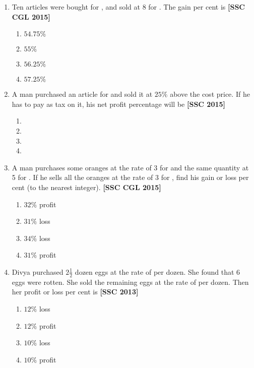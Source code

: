 \documentclass[twocolumn]{article}
\begin{document}
\begin{enumerate}
        \item Ten articles were bought for , and sold at 8 for . The gain per cent is \hfill {\bf[SSC CGL 2015]}
            \begin{enumerate}
                \item $54.75 \%$
                \item $55 \%$
                \item $56.25 \%$
                \item $57.25 \%$
            \end{enumerate}
            
        \item A man purchased an article for  and sold it at $25 \%$ above the cost price. If he has to pay  as tax on it, his net profit percentage will be \hfill {\bf[SSC 2015]}
            \begin{enumerate}
                \item {}
                \item {}
                \item {}
                \item {}
            \end{enumerate}
            
        \item A man purchases some oranges at the rate of 3 for  and the same quantity at 5 for . If he sells all the oranges at the rate of 3 for , find his gain or loss per cent (to the nearest integer). \hfill {\bf[SSC CGL 2015]}
            \begin{enumerate}
                \item $32 \%$ profit
                \item $31 \%$ loss
                \item $34 \%$ loss
                \item $31 \%$ profit
            \end{enumerate}
            
        \item Divya purchased $2 \frac{1}{2}$ dozen eggs at the rate of  per dozen. She found that 6 eggs were rotten. She sold the remaining eggs at the rate of  per dozen. Then her profit or loss per cent is \hfill {\bf[SSC 2013]}
            \begin{enumerate}
                \item $12 \%$ loss
                \item $12 \%$ profit
                \item $10 \%$ loss
                \item $10 \%$ profit
            \end{enumerate}
            

\end{enumerate}
\end{document}
